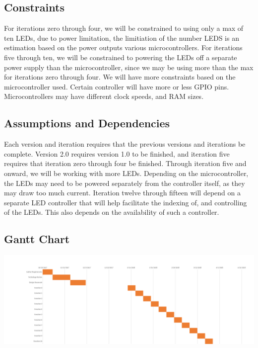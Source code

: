 		\subsection{Constraints}
		For iterations zero through four, we will be constrained to using only a max of ten LEDs, due to power limitation, the limitiation of the number LEDS is an estimation based on the power outputs various microcontrollers. For iterations five through ten, we will be constrained to powering the LEDs off a separate power supply than the microcontroller,
		since we may be using more than the max for iterations zero through four. We will have more constraints based on the microcontroller used. Certain controller will have more or less GPIO pins. Microcontrollers may have different clock speeds, and RAM sizes.

		\subsection{Assumptions and Dependencies}
		Each version and iteration requires that the previous versions and iterations be complete. Version 2.0 requires version 1.0 to be finished, and iteration five requires that iteration zero through four be finished.
		Through iteration five and onward, we will be working with more LEDs. Depending on the microcontroller, the LEDs may need to be powered separately from the controller itself, as they may draw too much current.
		Iteration twelve through fifteen will depend on a separate LED controller that will help facilitate the indexing of, and controlling of the LEDs. This also depends on the availability of such a controller.

		\newpage
		\begin{landscape}
		\subsection{Gantt Chart}
		\includegraphics[width=\linewidth]{Gant.png}
		\end{landscape}
		\newpage


